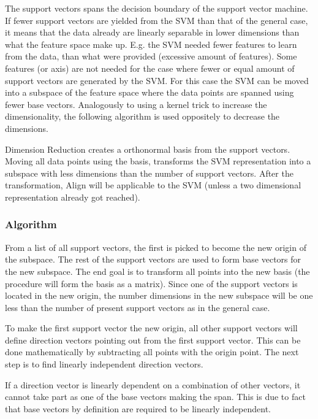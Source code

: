 \documentclass[a4paper,twoside]{bth}
\begin{document}
\par The support vectors spans the decision boundary of the support vector machine. If fewer support vectors are yielded from the SVM than that of the general case, it means that the data already are linearly separable in lower dimensions than what the feature space make up. E.g. the SVM needed fewer features to learn from the data, than what were provided (excessive amount of features). Some features (or axis) are not needed for the case where fewer or equal amount of support vectors are generated by the SVM. For this case the SVM can be moved into a subspace of the feature space where the data points are spanned using fewer base vectors. Analogously to using a kernel trick to increase the dimensionality, the following algorithm is used oppositely to decrease the dimensions.

\par Dimension Reduction creates a orthonormal basis from the support vectors. Moving all data points using the basis, transforms the SVM representation into a subspace with less dimensions than the number of support vectors. After the transformation, Align will be applicable to the SVM (unless a two dimensional representation already got reached). 


\subsubsection{Algorithm}
From a list of all support vectors, the first is picked to become the new origin of the subspace. The rest of the support vectors are used to form base vectors for the new subspace. The end goal is to transform all points into the new basis (the procedure will form the basis as a matrix). Since one of the support vectors is located in the new origin, the number dimensions in the new subspace will be one less than the number of present support vectors as in the general case.

\par To make the first support vector the new origin, all other support vectors will define direction vectors pointing out from the first support vector. This can be done mathematically by subtracting all points with the origin point. The next step is to find linearly independent direction vectors.

\par If a direction vector is linearly dependent on a combination of other vectors, it cannot take part as one of the base vectors making the span. This is due to fact that base vectors by definition are required to be linearly independent. 
\end{document}
